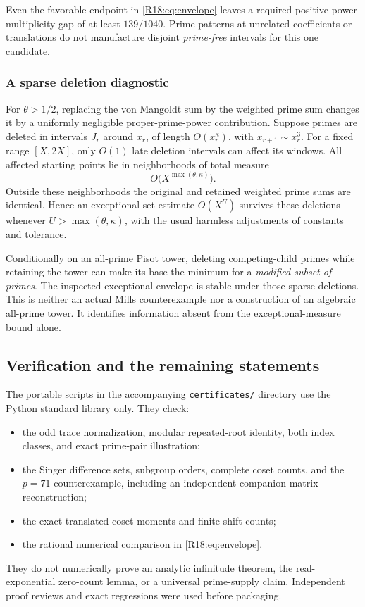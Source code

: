 \documentclass[11pt,a4paper]{article}
\theoremstyle{definition}\newtheorem{definition}[theorem]{Definition}
\theoremstyle{remark}\newtheorem{remark}[theorem]{Remark}
\begin{document}
Even the favorable endpoint in \eqref{R18:eq:envelope} leaves a required
positive-power multiplicity gap of at least $139/1040$. Prime
patterns at unrelated coefficients or translations do not manufacture
disjoint \emph{prime-free} intervals for this one candidate.

\subsubsection{A sparse deletion diagnostic}

For $\theta>1/2$, replacing the von Mangoldt sum by the weighted
prime sum changes it by a uniformly negligible proper-prime-power
contribution. Suppose primes are deleted in intervals $J_r$ around
$x_r$, of length $O(x_r^\kappa)$, with $x_{r+1}\sim x_r^3$.
For a fixed range $[X,2X]$, only $O(1)$ late deletion intervals can
affect its windows. All affected starting points lie in neighborhoods
of total measure
\[
 O\bigl(X^{\max(\theta,\kappa)}\bigr).
\]
Outside these neighborhoods the original and retained weighted prime
sums are identical. Hence an exceptional-set estimate $O(X^U)$
survives these deletions whenever $U>\max(\theta,\kappa)$, with
the usual harmless adjustments of constants and tolerance.

Conditionally on an all-prime Pisot tower, deleting competing-child
primes while retaining the tower can make its base the minimum for
a \emph{modified subset of primes}. The inspected exceptional
envelope is stable under those sparse deletions. This is neither an
actual Mills counterexample nor a construction of an algebraic
all-prime tower. It identifies information absent from the
exceptional-measure bound alone.

\subsection{Verification and the remaining statements}

The portable scripts in the accompanying \texttt{certificates/}
directory use the Python standard library only. They check:
\begin{itemize}
\item the odd trace normalization, modular repeated-root identity,
both index classes, and exact prime-pair illustration;
\item the Singer difference sets, subgroup orders, complete coset
counts, and the $p=71$ counterexample, including an independent
companion-matrix reconstruction;
\item the exact translated-coset moments and finite shift counts;
\item the rational numerical comparison in \eqref{R18:eq:envelope}.
\end{itemize}
They do not numerically prove an analytic infinitude theorem, the
real-exponential zero-count lemma, or a universal prime-supply claim.
Independent proof reviews and exact regressions were used before packaging.
\end{document}
